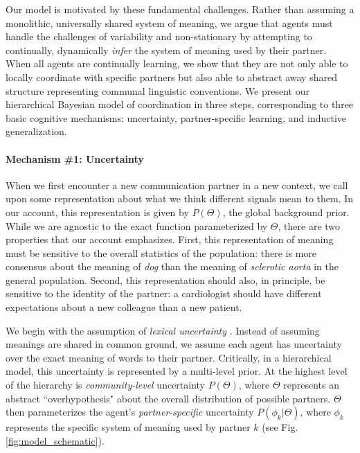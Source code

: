 Our model is motivated by these fundamental challenges.
Rather than assuming a monolithic, universally shared system of meaning, we argue that agents must handle the challenges of variability and non-stationary by attempting to continually, dynamically \emph{infer} the system of meaning used by their partner.
When all agents are continually learning, we show that they are not only able to locally coordinate with specific partners but also able to abstract away shared structure representing communal linguistic conventions.
We present our hierarchical Bayesian model of coordination in three steps, corresponding to three basic cognitive mechanisms: uncertainty, partner-specific learning, and inductive generalization.

\paragraph{Mechanism \#1: Uncertainty} 

When we first encounter a new communication partner in a new context, we call upon some representation about what we think different signals mean to them. 
In our account, this representation is given by $P(\Theta)$, the global background prior.
While we are agnostic to the exact function parameterized by $\Theta$, there are two properties that our account emphasizes.
First, this representation of meaning must be sensitive to the overall statistics of the population: there is more consensus about the meaning of \emph{dog} than the meaning of \emph{sclerotic aorta} in the general population. 
Second, this representation should also, in principle, be sensitive to the identity of the partner: a cardiologist should have different expectations about a new colleague than a new patient.

We begin with the assumption of \emph{lexical uncertainty} \cite{smith_learning_2013,bergen_pragmatic_2016}. 
Instead of assuming meanings are shared in common ground, we assume each agent has uncertainty over the exact meaning of words to their partner.
Critically, in a hierarchical model, this uncertainty is represented by a multi-level prior. 
At the highest level of the hierarchy is \emph{community-level} uncertainty $P(\Theta)$, where $\Theta$ represents an abstract ``overhypothesis" about the overall distribution of possible partners. 
$\Theta$ then parameterizes the agent's \emph{partner-specific} uncertainty $P(\phi_{k} | \Theta)$, where $\phi_k$ represents the specific system of meaning used by partner $k$ (see Fig. \ref{fig:model_schematic}). 

